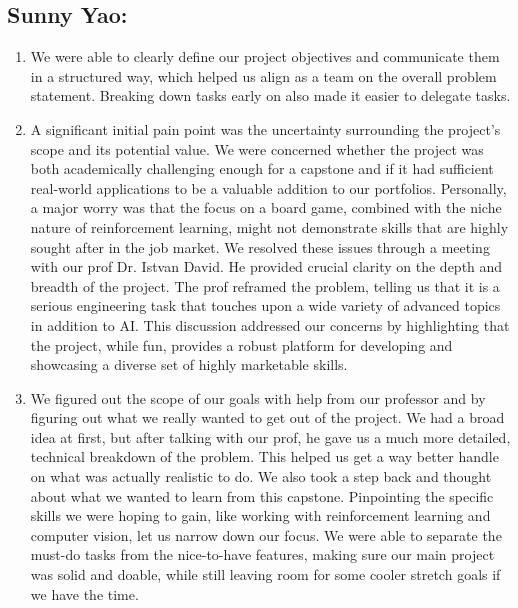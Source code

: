 \documentclass{article}
\begin{document}
\subsection*{Sunny Yao:}\label{subsec:sunny-yao-reflection}
\begin{enumerate}
    \item
        We were able to clearly define our project objectives and communicate them in a structured way, which helped us align as a 
        team on the overall problem statement. Breaking down tasks early on also made it easier to delegate tasks.
    \item
        A significant initial pain point was the uncertainty surrounding the project's scope and its potential value.
        We were concerned whether the project was both academically challenging enough for a capstone and if it had sufficient 
        real-world applications to be a valuable addition to our portfolios.
        Personally, a major worry was that the focus on a board game, combined with the niche nature of reinforcement learning, 
        might not demonstrate skills that are highly sought after in the job market.
        We resolved these issues through a meeting with our prof Dr. Istvan David.
        He provided crucial clarity on the depth and breadth of the project.
        The prof reframed the problem, telling us that it is a serious engineering task that touches upon a wide variety of advanced topics in addition to AI.
        This discussion addressed our concerns by highlighting that the project, while fun, provides a robust platform for developing and showcasing a diverse set of highly marketable skills.
    \item
        We figured out the scope of our goals with help from our professor and by figuring out what we really wanted to get out of the project.
        We had a broad idea at first, but after talking with our prof, he gave us a much more detailed, technical breakdown of the problem.
        This helped us get a way better handle on what was actually realistic to do.
        We also took a step back and thought about what we wanted to learn from this capstone.
        Pinpointing the specific skills we were hoping to gain, like working with reinforcement learning and computer vision, let us narrow down our focus.
        We were able to separate the must-do tasks from the nice-to-have features, making sure our main project was solid and doable, while still leaving room for some cooler stretch goals if we have the time.

\end{enumerate}
\end{document}
